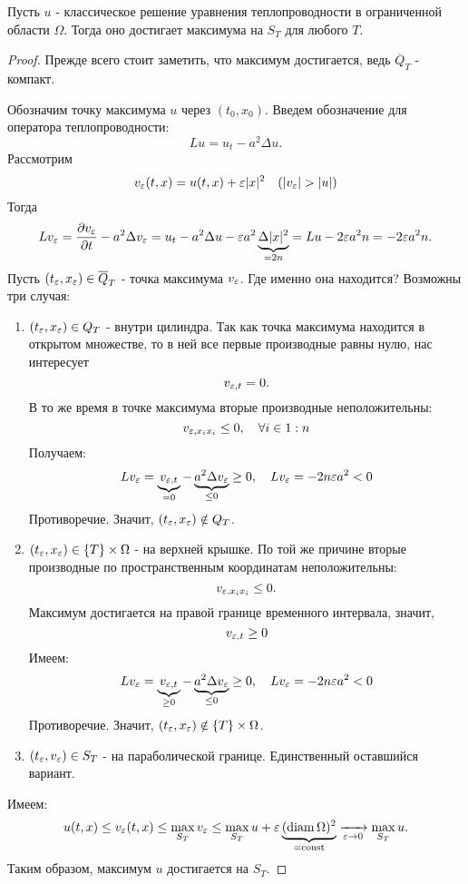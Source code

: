 \begin{theorem}

Пусть $u$ - классическое решение уравнения теплопроводности в ограниченной области $\Omega$. Тогда оно достигает максимума на $S_T$ для любого $T$.
\end{theorem}
\begin{proof}
Прежде всего стоит заметить, что максимум достигается, ведь $\overline{Q}_T$ - компакт.

Обозначим точку максимума $u$ через $(t_0, x_0)$. Введем обозначение для оператора теплопроводности:
$$ Lu  = u_t - a^2 \Delta u.$$
Рассмотрим 
$$ v_{\eps} (t,x) = u(t,x) + \eps \abs{x}^2 \quad (\abs{v_{\eps}} > \abs{u})$$
Тогда
$$ L v_{\eps} = \pder[v_{\eps}]{t} - a^2 \Delta v_{\eps} = u_t - a^2 \Delta u - \eps a^2 \underbrace{\Delta \abs{x}^2}_{=2n} = Lu - 2 \eps a^2 n = - 2 \eps a^2 n.$$
Пусть $(t_{\eps}, x_{\eps}) \in \overline{Q}_T$ - точка максимума $v_{\eps}$. Где именно она находится? Возможны три случая:

\begin{enumerate}
\item $(t_{\eps}, x_{\eps}) \in Q_T$ - внутри цилиндра. Так как точка максимума находится в открытом множестве, то в ней все первые производные равны нулю, нас интересует $$v_{\eps, t} = 0.$$
В то же время в точке максимума вторые производные неположительны: $$ v_{\eps, x_i x_i} \leq 0, \quad \forall i \in 1:n $$
Получаем:
$$Lv_{\eps}  = \underbrace {v_{\eps,t}}_{=0} - \underbrace {a^2 \Delta v_{\eps}}_{\leq 0} \geq 0, \quad L v_{\eps} = -2n \eps a^2 < 0$$
Противоречие. Значит, $(t_{\eps}, x_{\eps}) \notin Q_T$.
\item $(t_{\eps}, x_{\eps}) \in \left\{ T \right\} \times \Omega$ - на верхней крышке. По той же причине вторые производные по пространственным координатам неположительны:
$$ v_{\eps, x_i x_i} \leq 0.$$
Максимум достигается на правой границе временного интервала, значит,
$$v_{\eps,t} \geq 0$$
Имеем:
$$Lv_{\eps}  = \underbrace {v_{\eps,t}}_{\geq 0} - \underbrace {a^2 \Delta v_{\eps}}_{\leq 0} \geq 0, \quad L v_{\eps} = -2n \eps a^2 < 0$$
Противоречие. Значит, $(t_{\eps}, x_{\eps}) \notin \left\{ T \right\} \times \Omega$.
\item $(t_{\eps}, v_{\eps}) \in S_T$ - на параболической границе. Единственный оставшийся вариант.
\end{enumerate}
Имеем:
$$ u(t,x) \leq v_{\eps} (t,x) \leq \max_{S_T} v_{\eps} \leq \max_{S_T} u + \eps \underbrace {(\diam \Omega)^2}_{=\const} \xrightarrow[\eps \to 0]{} \max_{S_T} u.$$
Таким образом, максимум $u$ достигается на $S_T$.

\end{proof}


